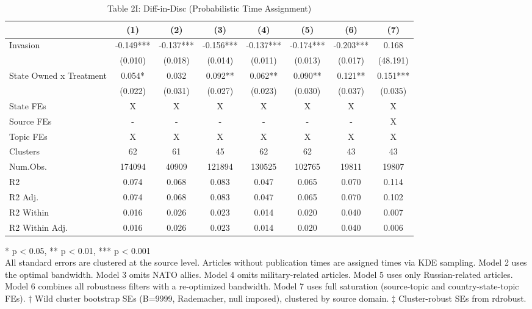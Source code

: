 \begin{table}[!t]
\caption{Table 2I: Diff-in-Disc (Probabilistic Time Assignment)} 
\fontsize{12.0pt}{14.4pt}\selectfont
\begin{tabular*}{\linewidth}{@{\extracolsep{\fill}}lccccccc}
\toprule
  & (1) & (2) & (3) & (4) & (5) & (6) & (7) \\ 
\midrule\addlinespace[2.5pt]
Invasion & -0.149*** & -0.137*** & -0.156*** & -0.137*** & -0.174*** & -0.203*** & 0.168 \\ 
 & (0.010) & (0.018) & (0.014) & (0.011) & (0.013) & (0.017) & (48.191) \\ 
State Owned x Treatment & 0.054* & 0.032 & 0.092** & 0.062** & 0.090** & 0.121** & 0.151*** \\ 
{} & {(0.022)} & {(0.031)} & {(0.027)} & {(0.023)} & {(0.030)} & {(0.037)} & {(0.035)} \\ 
State FEs & X & X & X & X & X & X & X \\ 
Source FEs & - & - & - & - & - & - & X \\ 
Topic FEs & X & X & X & X & X & X & X \\ 
Clusters & 62 & 61 & 45 & 62 & 62 & 43 & 43 \\ 
Num.Obs. & 174094 & 40909 & 121894 & 130525 & 102765 & 19811 & 19807 \\ 
R2 & 0.074 & 0.068 & 0.083 & 0.047 & 0.065 & 0.070 & 0.114 \\ 
R2 Adj. & 0.074 & 0.068 & 0.083 & 0.047 & 0.065 & 0.070 & 0.102 \\ 
R2 Within & 0.016 & 0.026 & 0.023 & 0.014 & 0.020 & 0.040 & 0.007 \\ 
R2 Within Adj. & 0.016 & 0.026 & 0.023 & 0.014 & 0.020 & 0.040 & 0.006 \\ 
\bottomrule
\end{tabular*}
\begin{minipage}{\linewidth}
* p < 0.05, ** p < 0.01, *** p < 0.001\\
All standard errors are clustered at the source level. Articles without
publication times are assigned times via KDE sampling. Model 2 uses the
optimal bandwidth. Model 3 omits NATO allies. Model 4 omits military-related
articles. Model 5 uses only Russian-related articles. Model 6 combines all
robustness filters with a re-optimized bandwidth. Model 7 uses full saturation
(source-topic and country-state-topic FEs). † Wild cluster bootstrap SEs
(B=9999, Rademacher, null imposed), clustered by source domain. ‡ Cluster-robust
SEs from rdrobust.\\
\end{minipage}
\end{table}

